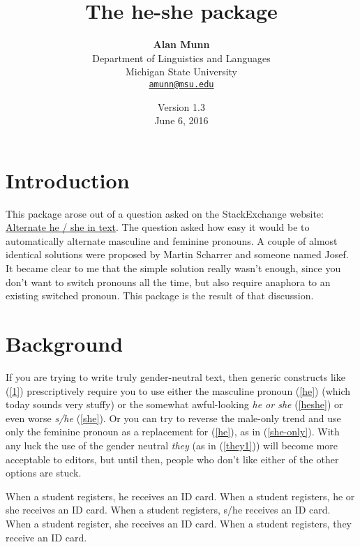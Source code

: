 \documentclass[11pt]{article}
\title{\textbf{The \textsf{he-she} package}}
\author{\textbf{Alan Munn}\\Department of Linguistics and Languages\\Michigan State University\\\texttt{\href{mailto:amunn@msu.edu}{amunn@msu.edu}}}
\date{Version 1.3\\June 6, 2016}
\begin{document}
\maketitle
\thispagestyle{empty}
\renewcommand{\abstractname}{\sffamily Abstract}

\section{Introduction}
This package arose out of a question asked on the StackExchange website: \href{http://tex.stackexchange.com/questions/10787/}{Alternate he / she in text}. The question asked how easy it would be to automatically alternate masculine and feminine pronouns. A couple of almost identical solutions were proposed by Martin Scharrer and someone named Josef.  It became clear to me that the simple solution really wasn't enough, since you don't want to switch pronouns all the time, but also require anaphora to an existing switched pronoun.  This package is the result of that discussion. 
\section{Background}
If you are trying to write truly gender-neutral text, then generic constructs like (\ref{1}) prescriptively require you to use either the masculine pronoun (\ref{he}) (which today sounds very stuffy) or the somewhat awful-looking \emph{he or she} (\ref{heshe}) or even worse \emph{s/he} (\ref{she}). Or you can try to reverse the male-only trend and use only the feminine pronoun as a replacement for (\ref{he}), as in (\ref{she-only}). With any luck the use of the gender neutral \emph{they} (as in (\ref{they1})) will become more acceptable to editors, but until then, people who don't like either of the other options are stuck.

\begin{exe}
\ex\label{1}
\begin{xlist}
\ex When a student registers, he receives an ID card.\label{he}
\ex When a student registers, he or she receives an ID card.\label{heshe}
\ex When a student registers, s/he receives an ID card.\label{she}
\ex When a student register, she receives an ID card.\label{she-only}
\ex When a student registers, they receive an ID card.\label{they1}
\end{xlist}
\end{exe}
\end{document}
